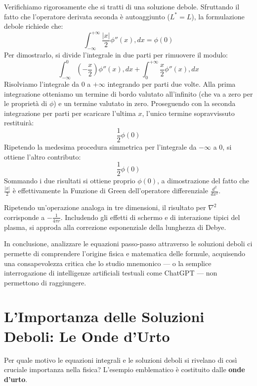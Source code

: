 Verifichiamo rigorosamente che si tratti di una soluzione debole. Sfruttando il fatto che l'operatore derivata seconda è autoaggiunto ($L^* = L$), la formulazione debole richiede che:
\begin{equation}
\int_{-\infty}^{+\infty} \frac{|x|}{2} \phi''(x) , dx = \phi(0)
\end{equation}
Per dimostrarlo, si divide l'integrale in due parti per rimuovere il modulo:
\begin{equation}
\int_{-\infty}^{0} \left(-\frac{x}{2}\right) \phi''(x) , dx + \int_{0}^{+\infty} \frac{x}{2} \phi''(x) , dx
\end{equation}
Risolviamo l'integrale da $0$ a $+\infty$ integrando per parti due volte. Alla prima integrazione otteniamo un termine di bordo valutato all'infinito (che va a zero per le proprietà di $\phi$) e un termine valutato in zero. Proseguendo con la seconda integrazione per parti per scaricare l'ultima $x$, l'unico termine sopravvissuto restituirà:
\begin{equation}
\frac{1}{2} \phi(0)
\end{equation}
Ripetendo la medesima procedura simmetrica per l'integrale da $-\infty$ a $0$, si ottiene l'altro contributo:
\begin{equation}
\frac{1}{2} \phi(0)
\end{equation}
Sommando i due risultati si ottiene proprio $\phi(0)$, a dimostrazione del fatto che $\frac{\vert{}x\vert{}}{2}$ è effettivamente la Funzione di Green dell'operatore differenziale $\frac{d^2}{dx^2}$.

Ripetendo un'operazione analoga in tre dimensioni, il risultato per $\nabla^2$ corrisponde a $-\frac{1}{4\pi r}$. Includendo gli effetti di schermo e di interazione tipici del plasma, si approda alla correzione esponenziale della lunghezza di Debye.

In conclusione, analizzare le equazioni passo-passo attraverso le soluzioni deboli ci permette di comprendere l'origine fisica e matematica delle formule, acquisendo una consapevolezza critica che lo studio mnemonico — o la semplice interrogazione di intelligenze artificiali testuali come ChatGPT — non permettono di raggiungere.

\section{L'Importanza delle Soluzioni Deboli: Le Onde d'Urto}

Per quale motivo le equazioni integrali e le soluzioni deboli si rivelano di così cruciale importanza nella fisica? L'esempio emblematico è costituito dalle \textbf{onde d'urto}.

